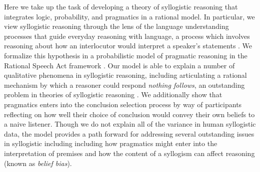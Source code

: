 \documentclass[floatsintext, doc]{apa6}
\newcommand{\mht}[1]{{\textcolor{Blue}{[mht: #1]}}}
\begin{document}
Here we take up the task of developing a theory of syllogistic reasoning that integrates logic, probability, and pragmatics in a rational model.
In particular, we view syllogistic reasoning through the lens of the language understanding processes that guide everyday reasoning with language, a process which involves reasoning about how an interlocutor would interpret a speaker's statements \cite{Grice1975, Clark1996, Levinson2000}. 
We formalize this hypothesis in a probabilistic model of pragmatic reasoning in the Rational Speech Act framework \cite{Frank2012a, goodman2016pragmatic}.
Our model is able to explain a number of qualitative phenomena in syllogistic reasoning, including articulating a rational mechanism by which a reasoner could respond \emph{nothing follows}, an outstanding problem in theories of syllogistic reasoning \cite{riesterer2020modeling}.
We additionally show that pragmatics enters into the conclusion selection process by way of participants reflecting on how well their choice of conclusion would convey their own beliefs to a naive listener. 
Though we do not explain all of the variance in human syllogistic data, the model provides a path forward for addressing several outstanding issues in syllogistic including including how pragmatics might enter into the interpretation of premises and  how the content of a syllogism can affect reasoning (known as \emph{belief bias}).




\end{document}

